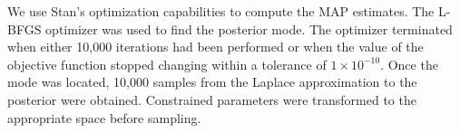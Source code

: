 We use Stan’s optimization capabilities to compute the MAP estimates.  The L-BFGS optimizer was used to find the posterior mode.  The optimizer terminated when either 10,000 iterations had been performed or when the value of the objective function stopped changing within a tolerance of $1\times10^{-10}$. Once the mode was located, 10,000 samples from the Laplace approximation to the posterior were obtained. Constrained parameters were transformed to the appropriate space before sampling.

%
%
%

